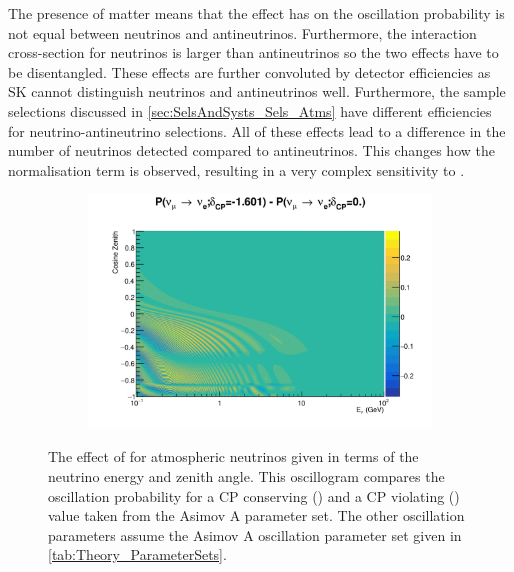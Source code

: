 The presence of matter means that the effect  has on the oscillation probability is not equal between neutrinos and antineutrinos. Furthermore, the interaction cross-section for neutrinos is larger than antineutrinos so the two effects have to be disentangled. These effects are further convoluted by detector efficiencies as SK cannot distinguish neutrinos and antineutrinos well. Furthermore, the sample selections discussed in \autoref{sec:SelsAndSysts_Sels_Atms} have different efficiencies for neutrino-antineutrino selections. All of these effects lead to a difference in the number of neutrinos detected compared to antineutrinos. This changes how the  normalisation term is observed, resulting in a very complex sensitivity to .

\begin{figure}[h]
  \begin{subfigure}[t]{\textwidth}
    \includegraphics[width=\textwidth, trim={0mm 0mm 0mm 0mm}, clip,page=1]{Figures/Oscillation/AtmDCPSens.pdf}
  \end{subfigure}
  \caption{The effect of  for atmospheric neutrinos given in terms of the neutrino energy and zenith angle. This oscillogram compares the  oscillation probability for a CP conserving () and a CP violating () value taken from the Asimov A parameter set. The other oscillation parameters assume the Asimov A oscillation parameter set given in \autoref{tab:Theory_ParameterSets}.}
  \label{fig:Oscillation_SK_DCPSensitivity}
\end{figure}

